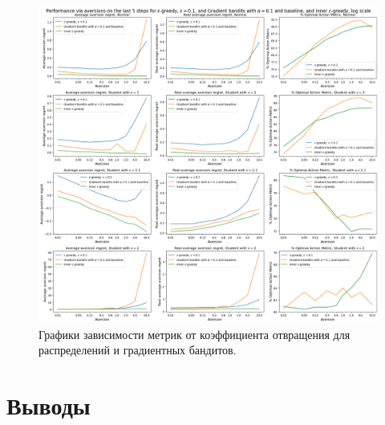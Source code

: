 \begin{figure}[ht!] %
\centering
\includegraphics[width=6in]{Figures/experiments_aversion/gradient_bandits/last_5_steps.png}
\caption{Графики зависимости метрик от коэффициента отвращения для распределений и градиентных бандитов.}
\label{fig:aversion_gradient_bandits_last_5_steps}
\end{figure}


\section{Выводы}

